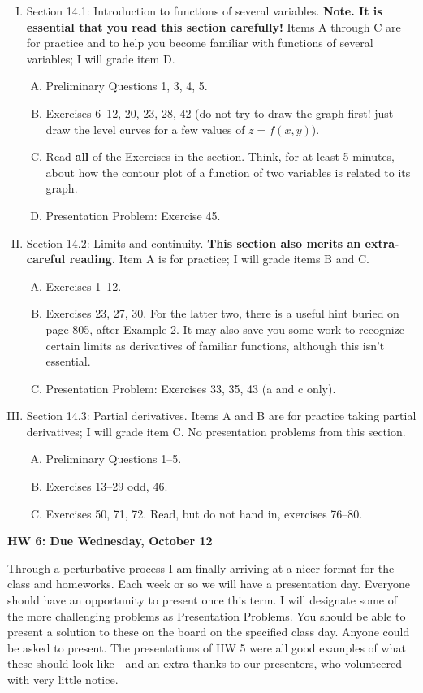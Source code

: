 \documentclass[10pt]{amsart}
\begin{document}
\begin{enumerate}[I.]
    \item Section 14.1: Introduction to functions of several variables. \textbf{Note. It is essential that you read this section carefully!} Items A through C are for practice and to help you become familiar with functions of several variables; I will grade item D.
    \begin{enumerate}[A.]
        \item Preliminary Questions 1, 3, 4, 5.
        \item Exercises 6--12, 20, 23, 28, 42 (do not try to draw the graph first! just draw the level curves for a few values of $z = f(x,y)$).
        \item Read \textbf{all} of the Exercises in the section. Think, for at least 5 minutes, about how the contour plot of a function of two variables is related to its graph.
        \item Presentation Problem: Exercise 45.
    \end{enumerate}
    \item Section 14.2: Limits and continuity. \textbf{This section also merits an extra-careful reading.} Item A is for practice; I will grade items B and C.
    \begin{enumerate}[A.]
        \item Exercises 1--12.
        \item Exercises 23, 27, 30. For the latter two, there is a useful hint buried on page 805, after Example 2. It may also save you some work to recognize certain limits as derivatives of familiar functions, although this isn't essential.
        \item Presentation Problem: Exercises 33, 35, 43 (a and c only).
    \end{enumerate}
    \item Section 14.3: Partial derivatives. Items A and B are for practice taking partial derivatives; I will grade item C. No presentation problems from this section.
    \begin{enumerate}[A.]
        \item Preliminary Questions 1--5.
        \item Exercises 13--29 odd, 46.
        \item Exercises 50, 71, 72. Read, but do not hand in, exercises 76--80.
    \end{enumerate}
\end{enumerate}

\begin{center}
\textbf{HW 6: Due Wednesday, October 12}
\end{center}
    Through a perturbative process I am finally arriving at a nicer format for the class and homeworks. Each week or so we will have a presentation day. Everyone should have an opportunity to present once this term. I will designate some of the more challenging problems as Presentation Problems. You should be able to present a solution to these on the board on the specified class day. Anyone could be asked to present. The presentations of HW 5 were all good examples of what these should look like---and an extra thanks to our presenters, who volunteered with very little notice.
\end{document}
